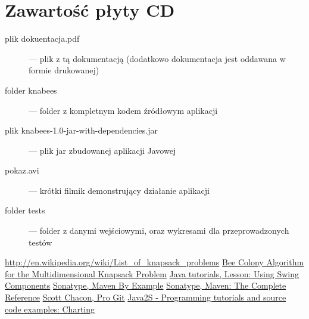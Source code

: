 \documentclass[a4paper,12pt,notitlepage]{mwrep}
\begin{document}
\appendix
\chapter*{Zawartość płyty CD}
\begin{description}
	\item[plik dokuentacja.pdf]	 --- plik z tą dokumentacją (dodatkowo dokumentacja jest oddawana w formie drukowanej)
	\item[folder knabees]	 --- folder z kompletnym kodem źródłowym aplikacji
	\item[plik knabees-1.0-jar-with-dependencies.jar]	 --- plik jar zbudowanej aplikacji Javowej
	\item[pokaz.avi]	 --- krótki filmik demonstrujący działanie aplikacji
	\item[folder tests]		--- folder z danymi wejściowymi, oraz wykresami dla przeprowadzonych testów
\end{description}

\addtocounter{page}{-1}

\begin{thebibliography}{9}
	\href{http://en.wikipedia.org/wiki/List_of_knapsack_problems}{http://en.wikipedia.org/wiki/List\_of\_knapsack\_problems}
	\href{http://www.iaeng.org/publication/IMECS2008/IMECS2008_pp84-88.pdf}{Bee Colony Algorithm for the Multidimensional Knapsack Problem}
	\href{http://docs.oracle.com/javase/tutorial/uiswing/components/index.html}{Java tutorials, Lesson: Using Swing Components}
	\href{http://www.sonatype.com/Support/Books/Maven-By-Example}{Sonatype, Maven By Example}
	\href{http://www.sonatype.com/Support/Books/Maven-The-Complete-Reference}{Sonatype, Maven: The Complete Reference}
	\href{http://git-scm.com/book/}{Scott Chacon, Pro Git}
	\href{http://www.java2s.com/Code/Java/Chart/CatalogChart.htm}{Java2S - Programming tutorials and source code examples: Charting}
\end{thebibliography}


\label{LastPage}
\end{document}

